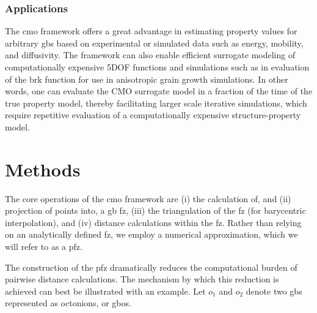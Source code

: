 \documentclass[preprint,12pt]{elsarticle}
\begin{document}
\subsubsection{Applications}

The \gls{cmo} framework offers a great advantage in estimating property values for arbitrary \glspl{gb} based on experimental or simulated data such as energy, mobility, and diffusivity. The framework can also enable efficient surrogate modeling of computationally expensive 5DOF functions and simulations such as in evaluation of the \gls{brk} function for use in anisotropic grain growth simulations. In other words, one can evaluate the CMO surrogate model in a fraction of the time of the true property model, thereby facilitating larger scale iterative simulations, which require repetitive evaluation of a computationally expensive structure-property model.


\section{Methods} \label{sec:methods}

The core operations of the \gls{cmo} framework are (i) the calculation of, and (ii) projection of points into, a \gls{gb} \gls{fz}, (iii) the triangulation of the \gls{fz} (for barycentric interpolation), and (iv) distance calculations within the \gls{fz}. Rather than relying on an analytically defined \gls{fz}, we employ a numerical approximation, which we will refer to as a \gls{pfz}.

The construction of the \gls{pfz} dramatically reduces the computational burden of pairwise distance calculations. The mechanism by which this reduction is achieved can best be illustrated with an example. Let $o_1$ and $o_2$ denote two \glspl{gb} represented as octonions, or \glspl{gbo}. 
\end{document}
